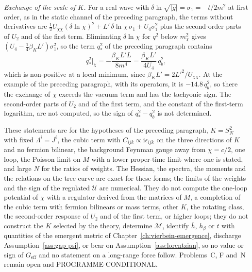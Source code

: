 \emph{Exchange of the scale of \(K\).} For a real wave with \(\delta\ln\sqrt{|g|}=\sigma_1=-t/2m^2\) at first order, as in the static channel of the preceding paragraph, the terms without derivatives are \(\tfrac12U_{\chi\chi}(\delta\ln\chi)^2+L'\,\delta\ln\chi\,\sigma_1+U_4\sigma_1^2\) plus the second-order parts of \(U_2\) and of the first term. Eliminating \(\delta\ln\chi\) for \(q^2\) below \(m_\chi^2\) gives \((U_4-\tfrac14\beta_KL')\sigma_1^2\), so the term \(q_*^2\) of the preceding paragraph contains
\[
  q_*^2\big|_\chi=-\frac{\beta_KL'L}{8m^4}=\frac{\beta_KL'}{4U_4}\,q_b^2 ,
\]
which is non-positive at a local minimum, since \(\beta_KL'=2L'^2/U_{\chi\chi}\). At the example of the preceding paragraph, with its operators, it is \(-14.8\,q_b^2\), so there the exchange of \(\chi\) exceeds the vacuum term and has the tachyonic sign. The second-order parts of \(U_2\) and of the first term, and the constant of the first-term logarithm, are not computed, so the sign of \(q_*^2-q_b^2\) is not determined.

These statements are for the hypotheses of the preceding paragraph, \(K=S^2_N\) with fixed \(\Lambda^i=J^i\), the cubic term with \(C_{ijk}\propto\mathrm i\epsilon_{ijk}\) on the three directions of \(K\) and no fermion bilinear, the background Feynman gauge away from \(\chi=c/2\), one loop, the Poisson limit on \(M\) with a lower proper-time limit where one is stated, and large \(N\) for the ratios of weights. The Hessian, the spectra, the moments and the relations on the tree curve are exact for these forms; the limits of the weights and the sign of the regulated \(\mathcal U\) are numerical. They do not compute the one-loop potential of \(\chi\) with a regulator derived from the matrices of \(M\), a completion of the cubic term with fermion bilinears or mass terms, other \(K\), the rotating class, the second-order response of \(U_2\) and of the first term, or higher loops; they do not construct the \(K\) selected by the theory, determine \(\mathcal M\), identify \(\bar h\), \(h_\beta\) or \(t\) with quantities of the emergent metric of Chapter~\ref{ch:vierbein-emergence}, discharge Assumption~\ref{ass:gap-psi}, or bear on Assumption~\ref{ass:lorentzian}, so no value or sign of \(G_{\mathrm{eff}}\) and no statement on a long-range force follow. Problems~C, F and~N remain open and PROGRAMME-CONDITIONAL.

